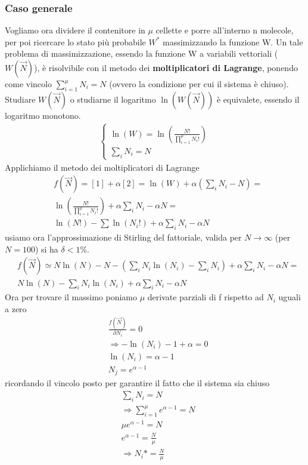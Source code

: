 \documentclass[10pt,a4paper]{article}
\begin{document}
\subsubsection*{Caso generale}
Vogliamo ora dividere il contenitore in $\mu$ cellette e porre all'interno n molecole, per poi ricercare lo stato più probabile \(W^*\) massimizzando la funzione W. Un tale problema di massimizzazione, essendo la funzione W a variabili vettoriali (\(W(\vec{N})\)), è risolvibile con il metodo dei \textbf{moltiplicatori di Lagrange}, ponendo come vincolo \(\sum_{i=1}^{\mu}N_i = N\) (ovvero la condizione per cui il sistema è chiuso).\\
Studiare \(W(\vec{N})\) o studiarne il logaritmo \(\ln(W(\vec{N}))\) è equivalete, essendo il logaritmo monotono. 
\begin{align*}
	\begin{cases}
		\ln(W)=\ln\left(\frac{N!}{\prod_{i=1}^\mu N_i!}\right)\\
		\sum_i N_i = N
		\end{cases}
\end{align*}
Applichiamo il metodo dei moltiplicatori di Lagrange
\begin{align*}
	&f(\vec{N})=[1]+\alpha[2]=\ln(W)+\alpha(\sum_iN_i -N)=\\
	&\ln\left(\frac{N!}{\prod_{i=1}^{\mu}N_i!}\right)+\alpha\sum_iN_i-\alpha N=\\
	&\ln(N!)-\sum\ln(N_i!)+\alpha \sum_i N_i -\alpha N
\end{align*}
usiamo ora l'approssimazione di Stirling del fattoriale, valida per \(N\to\infty\) (per \(N=100\)) si ha \(\delta < 1\%\). 
\begin{align*}
	&f(\vec{N})\simeq N\ln(N)-N-(\sum_iN_i\ln(N_i)-\sum_iN_i)+\alpha\sum_iN_i-\alpha N=\\
	&N\ln(N)-\sum_iN_i\ln(N_i)+\alpha\sum_iN_i-\alpha N
\end{align*}
Ora per trovare il massimo poniamo $\mu$ derivate parziali di f rispetto ad \(N_i\) uguali a zero 
\begin{align*}
	&\frac{f(\vec{N})}{\partial N_i}=0\\
	&\Rightarrow -\ln(N_i)-1+\alpha =0\\
	&\ln(N_i) = \alpha - 1\\
	&N_j = e^{\alpha - 1}
\end{align*}
ricordando il vincolo posto per garantire il fatto che il sistema sia chiuso
\begin{align*}
	&\sum_iN_i =N\\
	&\Rightarrow \sum_{i=1}^{\mu}e^{\alpha - 1}=N\\
	&\mu e^{\alpha -1}=N\\
	&e^{\alpha - 1}=\frac{N}{\mu}\\
	&\Rightarrow N_i* = \frac{N}{\mu}
\end{align*}
\end{document}
